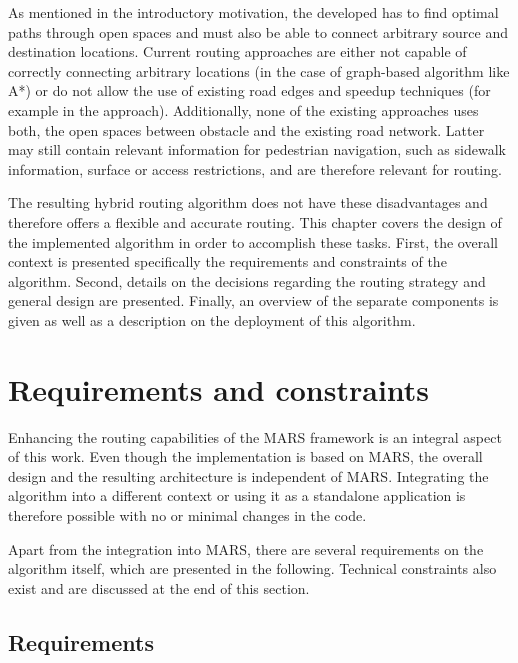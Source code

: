 
As mentioned in the introductory motivation, the developed  has to find optimal paths through open spaces and must also be able to connect arbitrary source and destination locations.
Current routing approaches are either not capable of correctly connecting arbitrary locations (in the case of graph-based algorithm like A*) or do not allow the use of existing road edges and speedup techniques (for example in the  approach).
Additionally, none of the existing approaches uses both, the open spaces between obstacle and the existing road network.
Latter may still contain relevant information for pedestrian navigation, such as sidewalk information, surface or access restrictions, and are therefore relevant for routing.

The resulting hybrid routing algorithm does not have these disadvantages and therefore offers a flexible and accurate routing.
This chapter covers the design of the implemented algorithm in order to accomplish these tasks.
First, the overall context is presented specifically the requirements and constraints of the algorithm.
Second, details on the decisions regarding the routing strategy and general design are presented.
Finally, an overview of the separate components is given as well as a description on the deployment of this algorithm.

\section{Requirements and constraints}
	
	Enhancing the routing capabilities of the MARS framework is an integral aspect of this work.
	Even though the implementation is based on MARS, the overall design and the resulting architecture is independent of MARS.
	Integrating the algorithm into a different context or using it as a standalone application is therefore possible with no or minimal changes in the code.
	
	Apart from the integration into MARS, there are several requirements on the algorithm itself, which are presented in the following.
	Technical constraints also exist and are discussed at the end of this section.
	
	\subsection{Requirements}
	
